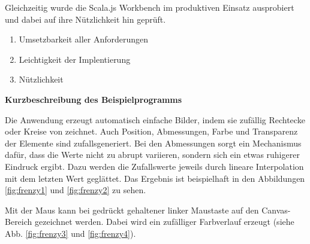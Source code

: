 \documentclass[a4paper, 12pt, hidelinks, listof=totoc, listoftables=totoc, bibliography=totoc]{scrreprt}
\newcommand{\MyMiniSec}[1]{\rmfamily\fontsize{12}{15}\selectfont
	\vspace{7pt}\textbf{#1} %
}
\begin{document}
Gleichzeitig wurde die Scala.js Workbench im produktiven Einsatz ausprobiert und dabei auf ihre Nützlichkeit hin geprüft.


\begin{enumerate}
	\item Umsetzbarkeit aller Anforderungen
	\item Leichtigkeit der Implentierung
	\item Nützlichkeit
\end{enumerate}

\MyMiniSec{Kurzbeschreibung des Beispielprogramms}

Die Anwendung erzeugt automatisch einfache Bilder, indem sie zufällig Rechtecke oder Kreise von zeichnet. Auch Position, Abmessungen, Farbe und Transparenz der Elemente sind zufallsgeneriert. Bei den Abmessungen sorgt ein Mechanismus dafür, dass die Werte nicht zu abrupt variieren, sondern sich ein etwas ruhigerer Eindruck ergibt. Dazu werden die Zufallswerte jeweils durch lineare Interpolation mit dem letzten Wert geglättet. Das Ergebnis ist beispielhaft in den Abbildungen \ref{fig:frenzy1} und \ref{fig:frenzy2} zu sehen.

Mit der Maus kann bei gedrückt gehaltener linker Maustaste auf den Canvas-Bereich gezeichnet werden. Dabei wird ein zufälliger Farbverlauf erzeugt (siehe Abb. \ref{fig:frenzy3} und \ref{fig:frenzy4}).
\end{document}
